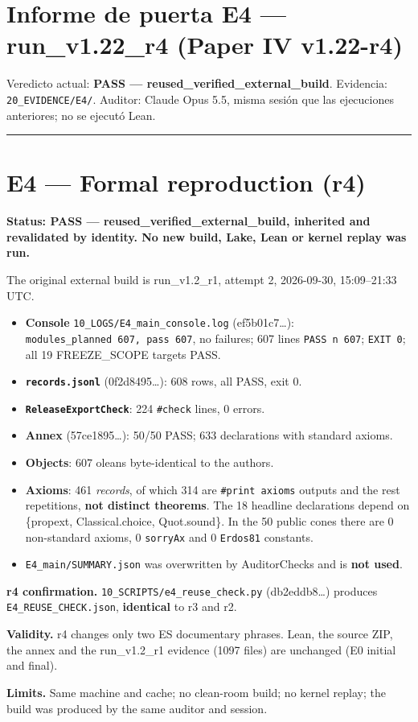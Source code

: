 \documentclass[
]{article}
\author{}
\date{}
\providecommand{\tightlist}{%
  \setlength{\itemsep}{0pt}\setlength{\parskip}{0pt}}
\begin{document}
\section{Informe de puerta E4 --- run\_v1.22\_r4 (Paper IV
v1.22-r4)}\label{informe-de-puerta-e4--run_v122_r4-paper-iv-v122-r4}

Veredicto actual: \textbf{PASS --- reused\_verified\_external\_build}.
Evidencia: \texttt{20\_EVIDENCE/E4/}. Auditor: Claude Opus 5.5, misma
sesión que las ejecuciones anteriores; no se ejecutó Lean.

\begin{center}\rule{0.5\linewidth}{0.5pt}\end{center}

\section{E4 --- Formal reproduction
(r4)}\label{e4--formal-reproduction-r4}

\textbf{Status: PASS --- reused\_verified\_external\_build, inherited
and revalidated by identity. No new build, Lake, Lean or kernel replay
was run.}

The original external build is run\_v1.2\_r1, attempt 2, 2026-09-30,
15:09--21:33 UTC.

\begin{itemize}
\tightlist
\item
  \textbf{Console} \texttt{10\_LOGS/E4\_main\_console.log}
  (ef5b01c7\ldots): \texttt{modules\_planned\ 607,\ pass\ 607}, no
  failures; 607 lines \texttt{PASS\ n\ 607}; \texttt{EXIT\ 0}; all 19
  FREEZE\_SCOPE targets PASS.
\item
  \textbf{\texttt{records.jsonl}} (0f2d8495\ldots): 608 rows, all PASS,
  exit 0.
\item
  \textbf{\texttt{ReleaseExportCheck}}: 224 \texttt{\#check} lines, 0
  errors.
\item
  \textbf{Annex} (57ce1895\ldots): 50/50 PASS; 633 declarations with
  standard axioms.
\item
  \textbf{Objects}: 607 oleans byte-identical to the
  author\textquotesingle s.
\item
  \textbf{Axioms}: 461 \emph{records}, of which 314 are
  \texttt{\#print\ axioms} outputs and the rest repetitions, \textbf{not
  distinct theorems}. The 18 headline declarations depend on \{propext,
  Classical.choice, Quot.sound\}. In the 50 public cones there are 0
  non-standard axioms, 0 \texttt{sorryAx} and 0 \texttt{Erdos81}
  constants.
\item
  \texttt{E4\_main/SUMMARY.json} was overwritten by AuditorChecks and is
  \textbf{not used}.
\end{itemize}

\textbf{r4 confirmation.} \texttt{10\_SCRIPTS/e4\_reuse\_check.py}
(db2eddb8\ldots) produces \texttt{E4\_REUSE\_CHECK.json},
\textbf{identical} to r3 and r2.

\textbf{Validity.} r4 changes only two ES documentary phrases. Lean, the
source ZIP, the annex and the run\_v1.2\_r1 evidence (1097 files) are
unchanged (E0 initial and final).

\textbf{Limits.} Same machine and cache; no clean-room build; no kernel
replay; the build was produced by the same auditor and session.
\end{document}
